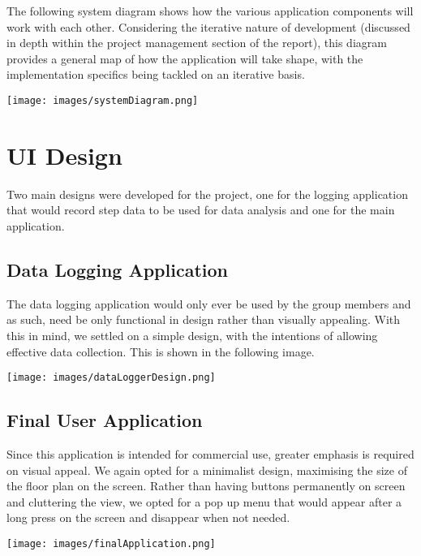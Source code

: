 \documentclass[main.tex]{subfiles}
\begin{document}
The following system diagram shows how the various application components will work with each other. Considering the iterative nature of development (discussed in depth within the project management section of the report), this diagram provides a general map of how the application will take shape, with the implementation specifics being tackled on an iterative basis.

\begin{center}
\texttt{[image: images/systemDiagram.png]}
\label{fig:systemDiagram}
\end{center}


\section{UI Design}

Two main designs were developed for the project, one for the logging application that would record step data to be used for data analysis and one for the main application.

\subsection{Data Logging Application}

The data logging application would only ever be used by the group members and as such, need be only functional in design rather than visually appealing. With this in mind, we settled on a simple design, with the intentions of allowing effective data collection. This is shown in the following image.

\begin{center}
\texttt{[image: images/dataLoggerDesign.png]}
\label{fig:dataLogger}
\end{center}

\subsection{Final User Application}

Since this application is intended for commercial use, greater emphasis is required on visual appeal. We again opted for a minimalist design, maximising the size of the floor plan on the screen. Rather than having buttons permanently on screen and cluttering the view, we opted for a pop up menu that would appear after a long press on the screen and disappear when not needed.

\begin{center}
\texttt{[image: images/finalApplication.png]}
\label{fig:finalApplication}
\end{center}
\end{document}
